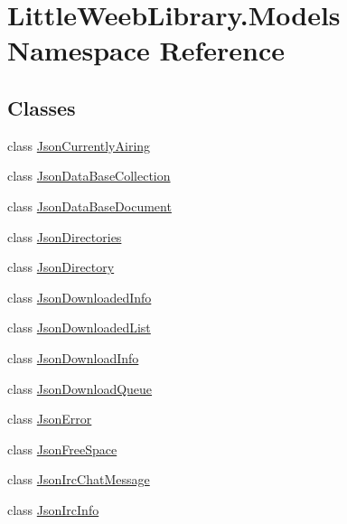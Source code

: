 \hypertarget{namespace_little_weeb_library_1_1_models}{}\section{Little\+Weeb\+Library.\+Models Namespace Reference}
\label{namespace_little_weeb_library_1_1_models}
\subsection*{Classes}
\begin{DoxyCompactItemize}
\item 
class \mbox{\hyperlink{class_little_weeb_library_1_1_models_1_1_json_currently_airing}{Json\+Currently\+Airing}}
\item 
class \mbox{\hyperlink{class_little_weeb_library_1_1_models_1_1_json_data_base_collection}{Json\+Data\+Base\+Collection}}
\item 
class \mbox{\hyperlink{class_little_weeb_library_1_1_models_1_1_json_data_base_document}{Json\+Data\+Base\+Document}}
\item 
class \mbox{\hyperlink{class_little_weeb_library_1_1_models_1_1_json_directories}{Json\+Directories}}
\item 
class \mbox{\hyperlink{class_little_weeb_library_1_1_models_1_1_json_directory}{Json\+Directory}}
\item 
class \mbox{\hyperlink{class_little_weeb_library_1_1_models_1_1_json_downloaded_info}{Json\+Downloaded\+Info}}
\item 
class \mbox{\hyperlink{class_little_weeb_library_1_1_models_1_1_json_downloaded_list}{Json\+Downloaded\+List}}
\item 
class \mbox{\hyperlink{class_little_weeb_library_1_1_models_1_1_json_download_info}{Json\+Download\+Info}}
\item 
class \mbox{\hyperlink{class_little_weeb_library_1_1_models_1_1_json_download_queue}{Json\+Download\+Queue}}
\item 
class \mbox{\hyperlink{class_little_weeb_library_1_1_models_1_1_json_error}{Json\+Error}}
\item 
class \mbox{\hyperlink{class_little_weeb_library_1_1_models_1_1_json_free_space}{Json\+Free\+Space}}
\item 
class \mbox{\hyperlink{class_little_weeb_library_1_1_models_1_1_json_irc_chat_message}{Json\+Irc\+Chat\+Message}}
\item 
class \mbox{\hyperlink{class_little_weeb_library_1_1_models_1_1_json_irc_info}{Json\+Irc\+Info}}

\end{DoxyCompactItemize}
